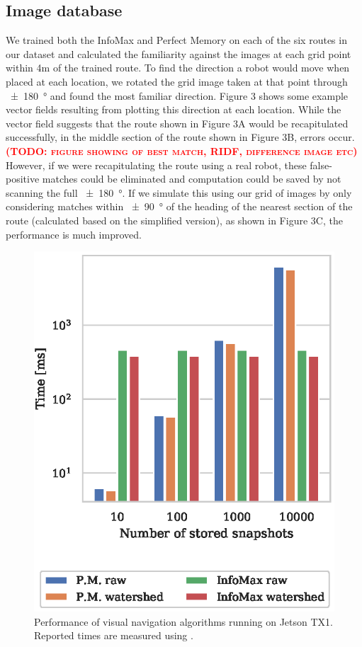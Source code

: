 \documentclass[letterpaper]{article}
\newcommand{\todo}[1]{\textbf{\textsc{\textcolor{red}{(TODO: #1)}}}}
\begin{document}
\subsection{Image database}
We trained both the InfoMax and Perfect Memory on each of the six routes in our dataset and calculated the familiarity against the images at each grid point within 4m of the trained route. 
To find the direction a robot would move when placed at each location, we rotated the grid image taken at that point through \SI{\pm 180}{\degree} and found the most familiar direction. 
Figure 3 shows some example vector fields resulting from plotting this direction at each location. 
While the vector field suggests that the route shown in Figure 3A would be recapitulated successfully, in the middle section of the route shown in Figure 3B, errors occur.
\todo{figure showing of best match, RIDF, difference image etc}
However, if we were recapitulating the route using a real robot, these false-positive matches could be eliminated and computation could be saved by not scanning the full \SI{\pm 180}{\degree}. 
If we simulate this using our grid of images by only considering matches within \SI{\pm 90}{\degree} of the heading of the nearest section of the route (calculated based on the simplified version), as shown in Figure 3C, the performance is much improved.

\begin{figure}[t]
    \includegraphics{figures/jetson_test_performance.eps}
    \caption{Performance of visual navigation algorithms running on Jetson TX1. Reported times are measured using .}
    \label{jetson_test_performance}
\end{figure}
\end{document}
